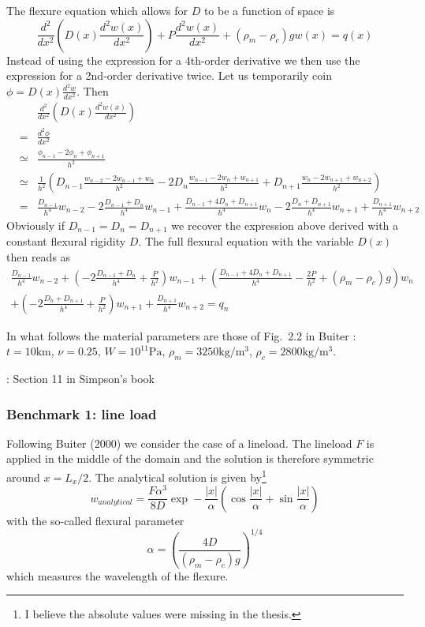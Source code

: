 The flexure equation which allows for $D$ to be a function of space is 
\[
\frac{d^2}{dx^2} \left( D(x) \frac{d^2w(x)}{dx^2} \right) + P \frac{d^2w(x)}{dx^2} 
+ (\rho_m-\rho_c)g w(x) = q(x)
\]
Instead of using the expression for a 4th-order derivative we then use the expression 
for a 2nd-order derivative twice. 
Let us temporarily coin $\phi=D(x) \frac{d^2w}{dx^2}$.
Then
\begin{eqnarray}
&&\frac{d^2}{dx^2} \left( D(x) \frac{d^2w(x)}{dx^2} \right)\\
&=& \frac{d^2 \phi}{dx^2} \\
&\simeq& \frac{\phi_{n-1}-2\phi_n+\phi_{n+1}}{h^2} \nonumber\\
&\simeq& \frac{1}{h^2}
\left(
D_{n-1} \frac{w_{n-2}-2w_{n-1}+w_{n}}{h^2}
-2 D_n \frac{w_{n-1}-2w_n+w_{n+1}}{h^2}
+ D_{n+1} \frac{w_{n}-2w_{n+1}+w_{n+2}}{h^2}
\right) \nonumber\\
&=&
\frac{D_{n-1}}{h^4} w_{n-2}
-2\frac{D_{n-1}+D_n}{h^4} w_{n-1}
+\frac{D_{n-1}+4D_n+D_{n+1}  }{h^4} w_n
-2\frac{D_{n}+D_{n+1}}{h^4} w_{n+1}
+\frac{D_{n+1}}{h^4} w_{n+2} \nonumber
\end{eqnarray}
Obviously if $D_{n-1}=D_n=D_{n+1}$ we recover the 
expression above derived with a constant flexural 
rigidity $D$.
The full flexural equation with the variable $D(x)$ then reads as
\begin{eqnarray}
\frac{D_{n-1}}{h^4} w_{n-2}
+\left(-2\frac{D_{n-1}+D_{n}}{h^4}+\frac{P}{h^2}\right)w_{n-1}
+\left(\frac{D_{n-1}+4D_{n}+D_{n+1}}{h^4}-\frac{2P}{h^2} +(\rho_m-\rho_c)g \right)w_n \nonumber\\
+\left(-2\frac{D_{n}+D_{n+1}}{h^4}+\frac{P}{h^2}\right)w_{n+1}
+\frac{D_{n+1}}{h^4} w_{n+2} = q_n
\end{eqnarray}

In what follows the material parameters are those of Fig.~2.2 in Buiter \cite{buiter_thesis}:
$t=10\si{\km}$, $\nu=0.25$, $W=10^{11}\si{\pascal}$, $\rho_m=3250\si{\kg\per\cubic\metre}$, 
$\rho_c=2800\si{\kg\per\cubic\metre}$.

\Literature: Section 11 in Simpson's book \cite{simp17}

\subsubsection*{Benchmark 1: line load}

Following Buiter (2000) \cite{buiter_thesis} we consider the case of a lineload.
The lineload $F$ is applied in the middle of the domain and the solution 
is therefore symmetric around $x=L_x/2$.
The analytical solution is given by\footnote{I believe the absolute values
were missing in the thesis.} 
\[
w_{analytical} = \frac{F \alpha^3}{8 D} \exp -\frac{|x|}{\alpha}
\left(
\cos \frac{|x|}{\alpha} + \sin \frac{|x|}{\alpha} 
\right)
\]
with the so-called flexural parameter  
\[
\alpha=\left(\frac{4D}{(\rho_m-\rho_c)g}\right)^{1/4}
\]
which measures the wavelength of the flexure.

